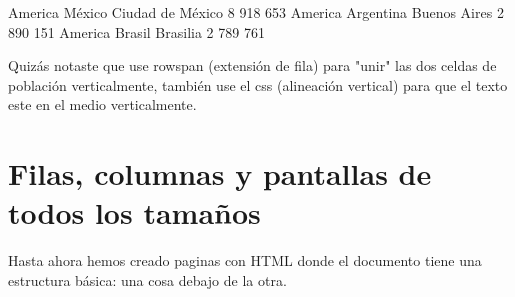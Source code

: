\documentclass[letterpaper,10pt,spanish]{sphinxmanual}
\begin{document}
\begin{sphinxVerbatim}[commandchars=\\\{\}]
      America
      México
      Ciudad de México
      8 918 653
      America
      Argentina
      Buenos Aires
      2 890 151
      America
      Brasil
      Brasilia
      2 789 761
\end{sphinxVerbatim}



Quizás notaste que use rowspan (extensión de fila) para "unir" las dos celdas de población verticalmente, también use el css  (alineación vertical) para que el texto este en el medio verticalmente.


\chapter{Filas, columnas y pantallas de todos los tamaños}
\label{\detokenize{filas-columnas::doc}}\label{\detokenize{filas-columnas:filas-columnas-y-pantallas-de-todos-los-tamanos}}
Hasta ahora hemos creado paginas con HTML donde el documento tiene una
estructura básica: una cosa debajo de la otra.
\end{document}
